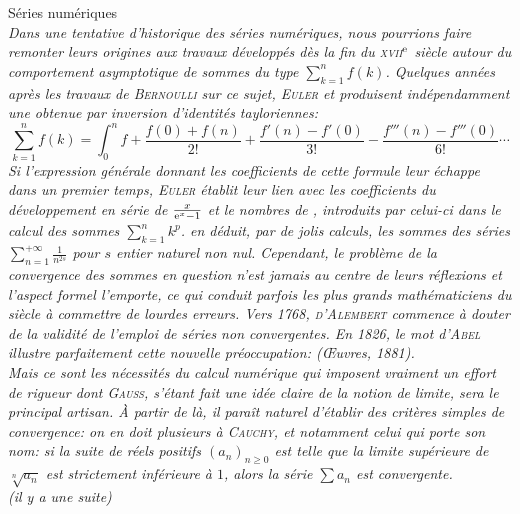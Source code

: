 Séries numériques \\
\textsl{
Dans une tentative d'historique des séries numériques, nous pourrions faire remonter leurs origines aux travaux développés dès la fin du \textsc{xvii}$^{\mathrm{e}}$ siècle autour du comportement asymptotique de sommes du type $\sum\limits_{k=1}^n f(k)$. Quelques années après les travaux de \textsc{Bernoulli} sur ce sujet, \textsc{Euler} et  produisent indépendamment une  obtenue par inversion d'identités tayloriennes:
$$\sum_{k=1}^n f(k) = \int_0^n f + \frac{f(0) + f(n)}{2!} + \frac{f'(n) - f'(0)}{3!} - \frac{f'''(n) - f'''(0)}{6!}\cdots$$
Si l'expression générale donnant les coefficients de cette formule leur échappe dans un premier temps, \textsc{Euler} établit leur lien avec les coefficients du développement en série de $\frac{x}{\mathrm{e}^x-1}$ et le nombres de , introduits par celui-ci dans le calcul des sommes $\sum\limits_{k=1}^n k^p$.  en déduit, par de jolis calculs, les sommes des séries $\sum\limits_{n=1}^{+\infty} \frac{1}{n^{2s}}$ pour $s$ entier naturel non nul.
Cependant, le problème de la convergence des sommes en question n'est jamais au centre de leurs réflexions et l'aspect formel l'emporte, ce qui conduit parfois les plus grands mathématiciens du siècle à commettre de lourdes erreurs. Vers 1768, \textsc{d'Alembert} commence à douter de la validité de l'emploi de séries non convergentes. En 1826, le mot d'\textsc{Abel} illustre parfaitement cette nouvelle préoccupation:  (Œuvres, 1881). \\
Mais ce sont les nécessités du calcul numérique qui imposent vraiment un effort de rigueur dont \textsc{Gauss}, s'étant fait une idée claire de la notion de limite, sera le principal artisan. À partir de là, il paraît naturel d'établir des critères simples de convergence: on en doit plusieurs à \textsc{Cauchy}, et notamment celui qui porte son nom: si la suite de réels positifs $(a_n)_{n \geqslant 0}$ est telle que la limite supérieure de $\sqrt[n]{a_n}$ est strictement inférieure à $1$, alors la série $\sum a_n$ est convergente. \\
(il y a une suite)
}